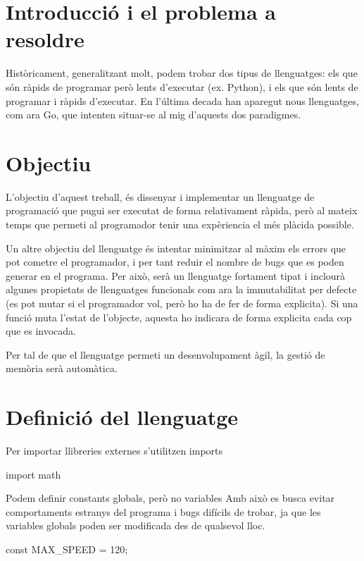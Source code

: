 ﻿\documentclass{article}
\begin{document}
\section{Introducció i el problema a resoldre}
Històricament, generalitzant molt, podem trobar dos tipus de llenguatges: els que 
són ràpids de programar però lents d'executar (ex. Python), i els que són lents 
de programar i ràpids d'executar. En l'última decada han aparegut nous
llenguatges, com ara Go, que intenten situar-se al mig d'aquests dos paradigmes.

\section{Objectiu}
L'objectiu d'aquest treball, és dissenyar i implementar un llenguatge de 
programació que pugui ser executat de forma relativament ràpida, però al mateix 
temps que permeti al programador tenir una expèriencia el més plàcida possible.

Un altre objectiu del llenguatge és intentar minimitzar al màxim els errors que
pot cometre el programador, i per tant reduir el nombre de bugs que es poden
generar en el programa. Per això, serà un llenguatge fortament tipat i inclourà
algunes propietats de llenguatges funcionals com ara la immutabilitat per 
defecte (es pot mutar si el programador vol, però ho ha de fer de forma 
explicita). Si una funció muta l'estat de l'objecte, aquesta ho indicara de 
forma explicita cada cop que es invocada.

Per tal de que el llenguatge permeti un desenvolupament àgil, la gestió de 
memòria serà automàtica.

\section{Definició del llenguatge}

Per importar llibreries externes s'utilitzen imports

\begin{code}
import math
\end{code}

Podem definir constants globals, però no variables
Amb això es busca evitar comportaments estranys del programa i bugs difícils
de trobar, ja que les variables globals poden ser modificada des de qualsevol
lloc.

\begin{code}
const MAX_SPEED = 120;
\end{code}
\end{document}

